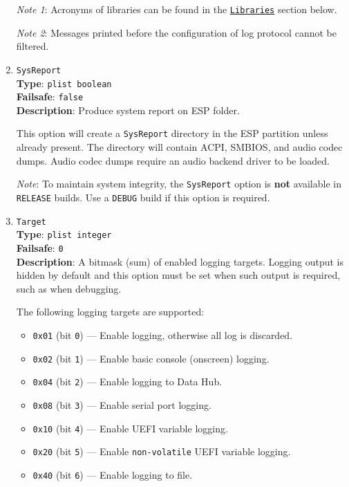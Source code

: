 \documentclass[]{article}
\providecommand{\tightlist}{%
  \setlength{\itemsep}{0pt}\setlength{\parskip}{0pt}}
\begin{document}
\begin{enumerate}
  \emph{Note 1}: Acronyms of libraries can be found in the
  \hyperref[oc-mod-libs]{\texttt{Libraries}} section below.

  \emph{Note 2}: Messages printed before the configuration of log protocol
  cannot be filtered.

\item
  \texttt{SysReport}\\
  \textbf{Type}: \texttt{plist\ boolean}\\
  \textbf{Failsafe}: \texttt{false}\\
  \textbf{Description}: Produce system report on ESP folder.

  This option will create a \texttt{SysReport} directory in the ESP partition
  unless already present. The directory will contain ACPI, SMBIOS, and audio codec dumps.
  Audio codec dumps require an audio backend driver to be loaded.

  \emph{Note}: To maintain system integrity, the \texttt{SysReport} option is \textbf{not}
  available in \texttt{RELEASE} builds. Use a \texttt{DEBUG} build if this option is required.

\item
  \texttt{Target}\\
  \textbf{Type}: \texttt{plist\ integer}\\
  \textbf{Failsafe}: \texttt{0}\\
  \textbf{Description}: A bitmask (sum) of enabled logging targets.
  Logging output is hidden by default and this option must be set
  when such output is required, such as when debugging.

  The following logging targets are supported:

  \begin{itemize}
  \tightlist
    \item \texttt{0x01} (bit \texttt{0}) --- Enable logging, otherwise all log is discarded.
    \item \texttt{0x02} (bit \texttt{1}) --- Enable basic console (onscreen) logging.
    \item \texttt{0x04} (bit \texttt{2}) --- Enable logging to Data Hub.
    \item \texttt{0x08} (bit \texttt{3}) --- Enable serial port logging.
    \item \texttt{0x10} (bit \texttt{4}) --- Enable UEFI variable logging.
    \item \texttt{0x20} (bit \texttt{5}) --- Enable \texttt{non-volatile} UEFI variable logging.
    \item \texttt{0x40} (bit \texttt{6}) --- Enable logging to file.
  \end{itemize}


\end{enumerate}
\end{document}
